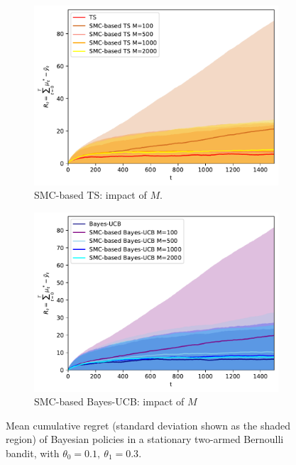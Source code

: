 \begin{figure}[!h]
	\begin{subfigure}[b]{0.46\textwidth}
		\centering
		\includegraphics[width=\textwidth]{./fods_figs/static/bernoulli/A2/theta0.1_0.3_allM_cumulative_regret_ts}
		\caption{SMC-based TS: impact of $M$.}
	\end{subfigure}
	\begin{subfigure}[b]{0.46\textwidth}
		\centering
		\includegraphics[width=\textwidth]{./fods_figs/static/bernoulli/A2/theta0.1_0.3_allM_cumulative_regret_bucb}
		\caption{SMC-based Bayes-UCB: impact of $M$}
	\end{subfigure}
	
	\caption{Mean cumulative regret (standard deviation shown as the shaded region) of Bayesian policies in a stationary two-armed Bernoulli bandit, with $\theta_0=0.1, \ \theta_1=0.3$.}
\end{figure}

